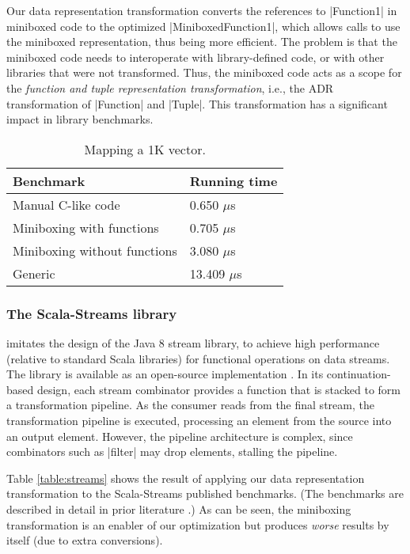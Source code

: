 Our data representation transformation converts the references to |Function1| in miniboxed code to the optimized |MiniboxedFunction1|, which allows calls to use the miniboxed representation, thus being more efficient. The problem is that the miniboxed code needs to interoperate with library-defined code, or with other libraries that were not transformed. Thus, the miniboxed code acts as a scope for the \emph{function and tuple representation transformation}, i.e., the ADR transformation of |Function| and |Tuple|. This transformation has a significant impact in library benchmarks.

\begin{table}[t]
  \begin{tabularx}{0.48\textwidth}{|g *{1}{|Y}|} \hline
    \textbf{Benchmark}             &  \textbf{Running time} \\ \hline
    Manual C-like code             &         0.650 $\mu$s \\
    Miniboxing with functions      &         0.705 $\mu$s \\
    Miniboxing without functions   &         3.080 $\mu$s \\
    Generic                        &        13.409 $\mu$s \\ \hline
  \end{tabularx}

  \caption{Mapping a 1K vector.}
  \label{table:framian}

\end{table}

\subsubsection{The Scala-Streams library} \cite{biboudis_clash_2014} imitates the design of the Java 8 stream library, to achieve high performance (relative to standard Scala libraries) for functional operations on data streams. The library is available as an open-source implementation \cite{biboudis-streams}. In its continuation-based design, each stream combinator provides a function that is stacked to form a transformation pipeline. As the consumer reads from the final stream, the transformation pipeline is executed, processing an element from the source into an output element. However, the pipeline architecture is complex, since combinators such as |filter| may drop elements, stalling the pipeline.

Table \ref{table:streams} shows the result of applying our data
representation transformation to the Scala-Streams published
benchmarks. (The benchmarks are described in detail in prior
literature \cite{biboudis_clash_2014,biboudis_et_al:ECOOP:short}.) As can be seen, the miniboxing
transformation is an enabler of our optimization but produces
\emph{worse} results by itself (due to extra conversions).

